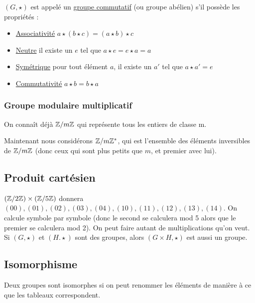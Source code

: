 \documentclass[11pt,a4paper]{article}
\begin{document}
$(G,\star)$ est appelé un \uline{groupe commutatif} (ou groupe abélien) s'il possède les propriétés :

\begin{itemize}
	\item 	\uline{Associativité} 	$a\star (b\star c) = (a\star b)\star c$
	\item 	\uline{Neutre} il existe un $e$ tel que $a\star e = e\star a = a$
	\item 	\uline{Symétrique} pour tout élément $a$, il existe un $a'$ tel que $a \star a' = e$
	\item 	\uline{Commutativité} $a\star b = b\star a$
\end{itemize}

\subsubsection{Groupe modulaire multiplicatif}
On connaît déjà $\mathbb{Z}/m\mathbb{Z}$ qui représente tous les entiers de classe m. 

Maintenant nous considérons \uline{$\mathbb{Z}/m\mathbb{Z}^*$}, qui est l'ensemble des éléments inversibles de $\mathbb{Z}/m\mathbb{Z}$ (donc ceux qui sont plus petits que $m$, et premier avec lui).

\subsection{Produit cartésien}
$(\mathbb{Z}/2\mathbb{Z}) \times (\mathbb{Z}/5\mathbb{Z})$ donnera $(00), (01), (02), (03) ,(04), (10), (11), (12), (13), (14)$. On calcule symbole par symbole (donc le second se calculera mod 5 alors que le premier se calculera mod 2). On peut faire autant de multiplications qu'on veut. Si $(G,\star)$ et $(H.\star)$ sont des groupes, alors $(G\times H,\star)$ est aussi un groupe.

\subsection{Isomorphisme}
Deux groupes sont isomorphes si on peut renommer les éléments de manière à ce que les tableaux correspondent.
\end{document}
